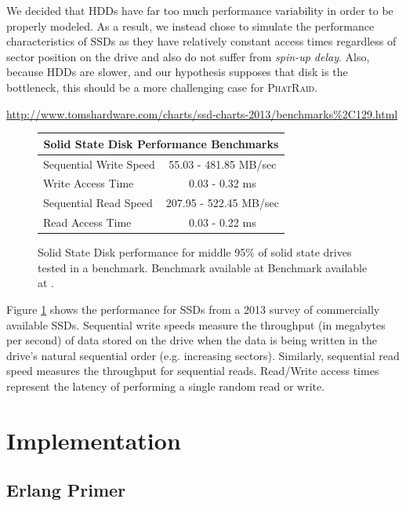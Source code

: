 \documentclass[10pt,letter]{article}
\newcommand{\phatraid}[0]{\textsc{PhatRaid}}
\begin{document}
We decided that HDDs have far too much performance variability in
order to be properly modeled. As a result, we instead chose to
simulate the performance characteristics of SSDs as they have
relatively constant access times regardless of sector position on the
drive and also do not suffer from {\em spin-up delay}. Also, because
HDDs are slower, and our hypothesis supposes that disk is the
bottleneck, this should be a more challenging case for \phatraid{}.

\urldef\hwbenchmark\url{http://www.tomshardware.com/charts/ssd-charts-2013/benchmarks%2C129.html}
\begin{figure}
\centering
\begin{tabular}{l || c}
\multicolumn{2}{c}{{\bf Solid State Disk Performance Benchmarks}} \\ \hline
Sequential Write Speed  \hspace{7em} & 55.03 - 481.85 MB/sec \\ 
Write Access Time & 0.03 - 0.32 ms \\ \hline
Sequential Read Speed &  207.95 - 522.45 MB/sec \\
Read Access Time & 0.03 - 0.22 ms \\ \hline
\end{tabular}
\caption[Solid State Performance]{Solid State Disk performance for middle 95\% of solid state drives tested in a benchmark. Benchmark available at Benchmark available at \hwbenchmark.}
\label{fig:ssd-perf}
\end{figure}

Figure \ref{fig:ssd-perf} shows the performance for SSDs from a 2013 survey of commercially available SSDs. Sequential write speeds measure the throughput (in megabytes per second) of data stored on the drive when the data is being written in the drive's natural sequential order (e.g. increasing sectors). Similarly, sequential read speed measures the throughput for sequential reads. Read/Write access times represent the latency of performing a single random read or write. 

\section{Implementation}

\subsection{Erlang Primer}
\end{document}
